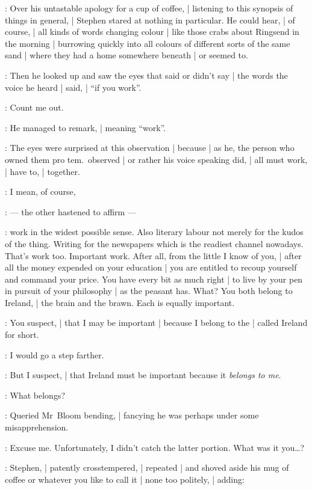 :
Over his untastable apology for a cup of coffee, |
listening to this synopsis of things in general, |
Stephen stared at nothing in particular.
He could hear, |
of course, |
all kinds of words changing colour |
like those crabs about Ringsend in the morning |
burrowing quickly into all colours of different sorts of the same sand |
where they had a home somewhere beneath |
or seemed to.

:
Then he looked up and saw the eyes that said or didn't say |
the words the voice he heard |
said, |
``if you work''.

\Stephen:
Count me out.

:
He managed to remark, |
meaning ``work''.

:
The eyes were surprised at this observation |
because |
as he, the person who owned them pro tem.\ observed |
or rather his voice speaking did, |
all must work, |
have to, |
together.

\Bloom:
I mean, of course,

:
    --- the other hastened to affirm ---

\Bloom:
work in the widest possible sense.
Also literary labour not merely for the kudos of the thing.
Writing for the newspapers which is the readiest channel nowadays.
That's work too.
Important work.
After all, from the little I know of you, |
after all the money expended on your education |
you are entitled to recoup yourself and command your price.
You have every bit as much right |
to live by your pen in pursuit of your philosophy |
as the peasant has.
What?
You both belong to Ireland, |
the brain and the brawn.
Each is equally important.

\Stephen:
You suspect, |
that I may be important |
because I belong to the  |
called Ireland for short.

\Bloom:
I would go a step farther.

\Stephen:
But I suspect, |
that Ireland must be important because it \emph{belongs to me}.

\Bloom:
What belongs?

:
Queried Mr~Bloom bending, |
fancying he was perhaps under some misapprehension.

\Bloom:
Excuse me.
Unfortunately, I didn't catch the latter portion.
What was it you\ldots?

:
Stephen, |
patently crosstempered, |
repeated |
and shoved aside his mug of coffee or whatever you like to call it |
none too politely, |
adding:

